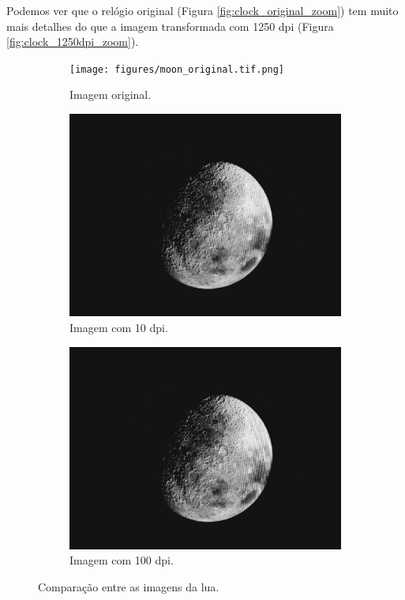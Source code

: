 \documentclass{article}
\begin{document}
Podemos ver que o relógio original (Figura \ref{fig:clock_original_zoom}) tem muito mais detalhes do que a imagem transformada com 1250 dpi (Figura \ref{fig:clock_1250dpi_zoom}).
\begin{figure}[H]
    \centering
        \begin{subfigure}[b]{0.3\textwidth}
            \texttt{[image: figures/moon\_original.tif.png]}
            \caption{Imagem original.}
            \label{fig:moon_original}
        \end{subfigure}
        \hfill
        \begin{subfigure}[b]{0.3\textwidth}
            \includegraphics[width=\textwidth, angle=180]{figures/moon_a.tif.png}
            \caption{Imagem com 10 dpi.}
            \label{fig:moon_10dpi}
        \end{subfigure}
        \hfill
        \begin{subfigure}[b]{0.3\textwidth}
            \includegraphics[width=\textwidth, angle=180]{figures/moon_b.tif.png}
            \caption{Imagem com 100 dpi.}
            \label{fig:moon_100dpi}
        \end{subfigure}
        \caption{Comparação entre as imagens da lua.}
        \label{fig:moon_comparison}
\end{figure}
\end{document}
